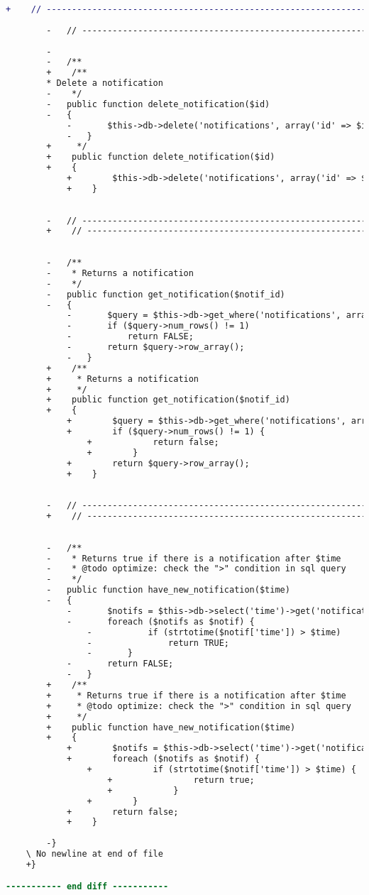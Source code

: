 \begin{lstlisting}[language=diff, caption=Perubahan pada kode Notifications\_model.php]
		+    // ------------------------------------------------------------------------
		
		-	// ------------------------------------------------------------------------
		
		-
		-	/**
		+    /**
		* Delete a notification
		-	 */
		-	public function delete_notification($id)
		-	{
			-		$this->db->delete('notifications', array('id' => $id));
			-	}
		+     */
		+    public function delete_notification($id)
		+    {
			+        $this->db->delete('notifications', array('id' => $id));
			+    }
		
		
		-	// ------------------------------------------------------------------------
		+    // ------------------------------------------------------------------------
		
		
		-	/**
		-	 * Returns a notification
		-	 */
		-	public function get_notification($notif_id)
		-	{
			-		$query = $this->db->get_where('notifications', array('id' => $notif_id));
			-		if ($query->num_rows() != 1)
			-			return FALSE;
			-		return $query->row_array();
			-	}
		+    /**
		+     * Returns a notification
		+     */
		+    public function get_notification($notif_id)
		+    {
			+        $query = $this->db->get_where('notifications', array('id' => $notif_id));
			+        if ($query->num_rows() != 1) {
				+            return false;
				+        }
			+        return $query->row_array();
			+    }
		
		
		-	// ------------------------------------------------------------------------
		+    // ------------------------------------------------------------------------
		
		
		-	/**
		-	 * Returns true if there is a notification after $time
		-	 * @todo optimize: check the ">" condition in sql query
		-	 */
		-	public function have_new_notification($time)
		-	{
			-		$notifs = $this->db->select('time')->get('notifications')->result_array();
			-		foreach ($notifs as $notif) {
				-			if (strtotime($notif['time']) > $time)
				-				return TRUE;
				-		}
			-		return FALSE;
			-	}
		+    /**
		+     * Returns true if there is a notification after $time
		+     * @todo optimize: check the ">" condition in sql query
		+     */
		+    public function have_new_notification($time)
		+    {
			+        $notifs = $this->db->select('time')->get('notifications')->result_array();
			+        foreach ($notifs as $notif) {
				+            if (strtotime($notif['time']) > $time) {
					+                return true;
					+            }
				+        }
			+        return false;
			+    }
		
		-}
	\ No newline at end of file
	+}

----------- end diff -----------
\end{lstlisting}

